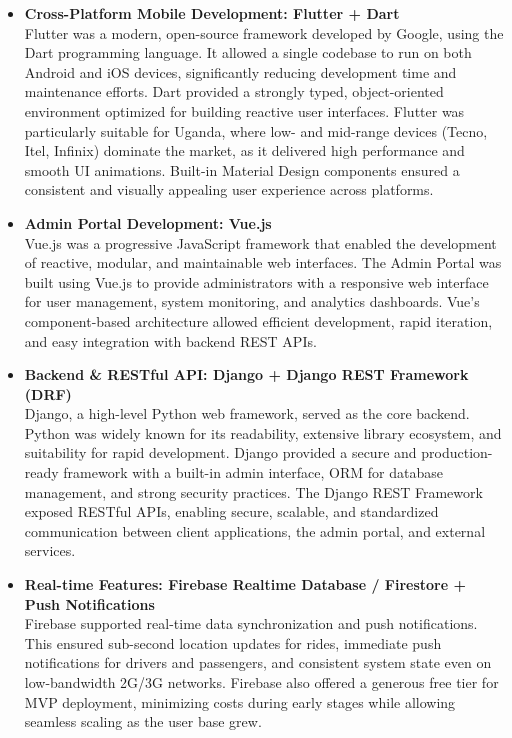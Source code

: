 \begin{itemize}
 \item \textbf{Cross-Platform Mobile Development: Flutter + Dart} \\
Flutter was a modern, open-source framework developed by Google, using the Dart
programming language. It allowed a single codebase to run on both Android and
iOS devices, significantly reducing development time and maintenance efforts.
Dart provided a strongly typed, object-oriented environment optimized for
building reactive user interfaces. Flutter was particularly suitable for Uganda,
where low- and mid-range devices (Tecno, Itel, Infinix) dominate the market, as
it delivered high performance and smooth UI animations. Built-in Material Design
components ensured a consistent and visually appealing user experience across
platforms.


 \item \textbf{Admin Portal Development: Vue.js} \\
Vue.js was a progressive JavaScript framework that enabled the development of
reactive, modular, and maintainable web interfaces. The Admin Portal was built
using Vue.js to provide administrators with a responsive web interface for user
management, system monitoring, and analytics dashboards. Vue’s component-based
architecture allowed efficient development, rapid iteration, and easy
integration with backend REST APIs.


 \item \textbf{Backend \& RESTful API: Django + Django REST Framework
        (DRF)} \\
Django, a high-level Python web framework, served as the core backend. Python
was widely known for its readability, extensive library ecosystem, and
suitability for rapid development. Django provided a secure and production-ready
framework with a built-in admin interface, ORM for database management, and
strong security practices. The Django REST Framework exposed RESTful APIs,
enabling secure, scalable, and standardized communication between client
applications, the admin portal, and external services.


 \item \textbf{Real-time Features: Firebase Realtime Database / Firestore
        + Push Notifications} \\
Firebase supported real-time data synchronization and push notifications. This
ensured sub-second location updates for rides, immediate push notifications for
drivers and passengers, and consistent system state even on low-bandwidth 2G/3G
networks. Firebase also offered a generous free tier for MVP deployment,
minimizing costs during early stages while allowing seamless scaling as the user
base grew.



\end{itemize}
